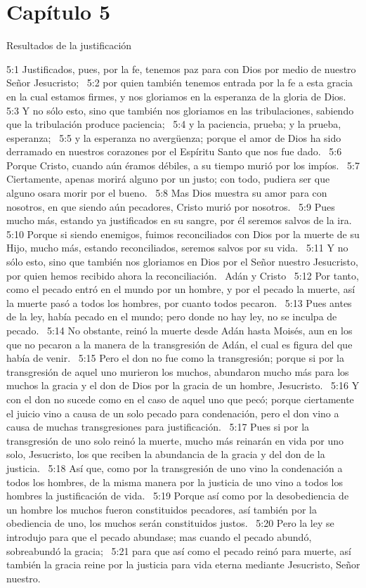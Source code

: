 \section*{Capítulo 5}
Resultados de la justificación  

5:1 Justificados, pues, por la fe, tenemos paz para con Dios por medio de nuestro Señor Jesucristo;  
5:2 por quien también tenemos entrada por la fe a esta gracia en la cual estamos firmes, y nos gloriamos en la esperanza de la gloria de Dios.  
5:3 Y no sólo esto, sino que también nos gloriamos en las tribulaciones, sabiendo que la tribulación produce paciencia;  
5:4 y la paciencia, prueba; y la prueba, esperanza;  
5:5 y la esperanza no avergüenza; porque el amor de Dios ha sido derramado en nuestros corazones por el Espíritu Santo que nos fue dado.  
5:6 Porque Cristo, cuando aún éramos débiles, a su tiempo murió por los impíos.  
5:7 Ciertamente, apenas morirá alguno por un justo; con todo, pudiera ser que alguno osara morir por el bueno.  
5:8 Mas Dios muestra su amor para con nosotros, en que siendo aún pecadores, Cristo murió por nosotros.  
5:9 Pues mucho más, estando ya justificados en su sangre, por él seremos salvos de la ira. 
5:10 Porque si siendo enemigos, fuimos reconciliados con Dios por la muerte de su Hijo, mucho más, estando reconciliados, seremos salvos por su vida.  
5:11 Y no sólo esto, sino que también nos gloriamos en Dios por el Señor nuestro Jesucristo, por quien hemos recibido ahora la reconciliación.  
Adán y Cristo  
5:12 Por tanto, como el pecado entró en el mundo por un hombre, y por el pecado la muerte, así la muerte pasó a todos los hombres, por cuanto todos pecaron.  
5:13 Pues antes de la ley, había pecado en el mundo; pero donde no hay ley, no se inculpa de pecado.  
5:14 No obstante, reinó la muerte desde Adán hasta Moisés, aun en los que no pecaron a la manera de la transgresión de Adán, el cual es figura del que había de venir.  
5:15 Pero el don no fue como la transgresión; porque si por la transgresión de aquel uno murieron los muchos, abundaron mucho más para los muchos la gracia y el don de Dios por la gracia de un hombre, Jesucristo.  
5:16 Y con el don no sucede como en el caso de aquel uno que pecó; porque ciertamente el juicio vino a causa de un solo pecado para condenación, pero el don vino a causa de muchas transgresiones para justificación.  
5:17 Pues si por la transgresión de uno solo reinó la muerte, mucho más reinarán en vida por uno solo, Jesucristo, los que reciben la abundancia de la gracia y del don de la justicia.  
5:18 Así que, como por la transgresión de uno vino la condenación a todos los hombres, de la misma manera por la justicia de uno vino a todos los hombres la justificación de vida.  
5:19 Porque así como por la desobediencia de un hombre los muchos fueron constituidos pecadores, así también por la obediencia de uno, los muchos serán constituidos justos.  
5:20 Pero la ley se introdujo para que el pecado abundase; mas cuando el pecado abundó, sobreabundó la gracia;  
5:21 para que así como el pecado reinó para muerte, así también la gracia reine por la justicia para vida eterna mediante Jesucristo, Señor nuestro.  

